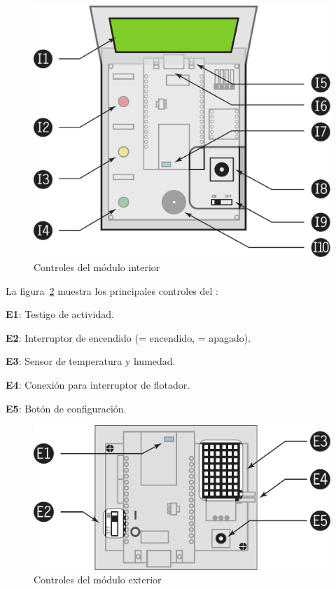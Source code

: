\begin{figure}
  \centering
  \includegraphics[width=0.8\columnwidth]{../design/interior-controls}
  \caption{Controles del módulo interior}
  \label{fig:interior-controls}
\end{figure}

La figura~\ref{fig:exterior-controls} muestra los principales controles del \ME:

\begin{enumeratecompact}
  \item[\textbf{\color{main}E1}:] Testigo de actividad.
  \item[\textbf{\color{main}E2}:] Interruptor de encendido (\on = encendido, \off = apagado).
  \item[\textbf{\color{main}E3}:] Sensor de temperatura y humedad.
  \item[\textbf{\color{main}E4}:] Conexión para interruptor de flotador.
  \item[\textbf{\color{main}E5}:] Botón de configuración.
\end{enumeratecompact}

\begin{figure}
  \centering
  \includegraphics[width=0.8\columnwidth]{../design/exterior-controls}
  \caption{Controles del módulo exterior}
  \label{fig:exterior-controls}
\end{figure}